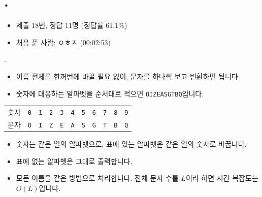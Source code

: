 
\section{\texorpdfstring{\pletter. \ptitle}{문제 \pletter}}

\begin{frame}[label=problem-B]
    \sectiontitle{\pletter}{\ptitle}
    \begin{itemize}
        \item 제출 18번, 정답 11명 (정답률 61.1\%)
        \item 처음 푼 사람: ㅇㅎㅈ (00:02:53)
    \end{itemize}
\end{frame}

\begin{frame}{\textbf{\pletter}. \ptitle}
\begin{itemize}
        \item 이름 전체를 한꺼번에 바꿀 필요 없이, 문자를 하나씩 보고 변환하면 됩니다.
        \item 숫자에 대응하는 알파벳을 순서대로 적으면 \texttt{OIZEASGTBQ}입니다.
    \end{itemize}
    \begin{center}
        \begin{tabular}{c|cccccccccc}
            숫자 & \texttt{0} & \texttt{1} & \texttt{2} & \texttt{3} & \texttt{4} & \texttt{5} & \texttt{6} & \texttt{7} & \texttt{8} & \texttt{9}\\
            문자 & \texttt{O} & \texttt{I} & \texttt{Z} & \texttt{E} & \texttt{A} & \texttt{S} & \texttt{G} & \texttt{T} & \texttt{B} & \texttt{Q}
        \end{tabular}
    \end{center}
    \begin{itemize}
        \item 숫자는 같은 열의 알파벳으로, 표에 있는 알파벳은 같은 열의 숫자로 바꿉니다.
        \item 표에 없는 알파벳은 그대로 출력합니다.
        \item 모든 이름을 같은 방법으로 처리합니다. 전체 문자 수를 $L$이라 하면 시간 복잡도는 $O(L)$입니다.
    \end{itemize}
\end{frame}
